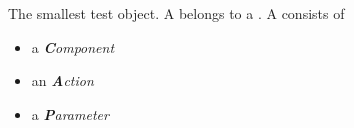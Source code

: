 \item[\gdstep]{
The smallest test object. A \gdstep belongs to a \gdcase. A \gdstep  consists of 
\begin{itemize}
\item a \emph{{\bf C}omponent}
\item an \emph{{\bf A}ction} 
\item a \emph{{\bf P}arameter}
\end{itemize}
}
